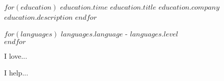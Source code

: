 \documentclass[9pt]{developercv} %
\begin{document}


\begin{entrylist}
    $for(education)$
        \entry
            {$education.time$}
            {$education.title$}
            {$education.company$}
            {$education.description$}
    $endfor$
\end{entrylist}


\begin{minipage}[t]{0.3\textwidth}
	\vspace{-\baselineskip} %

    $for(languages)$
        \textbf{$languages.language$} - $languages.level$\\
    $endfor$
\end{minipage}

\hfill

\begin{minipage}[t]{0.3\textwidth}
	\vspace{-\baselineskip} %
	
	
	I love... \lorem
\end{minipage}
\hfill
\begin{minipage}[t]{0.3\textwidth}
	\vspace{-\baselineskip} %
	
	
	I help... \lorem
\end{minipage}


\pagebreak
\end{document}
